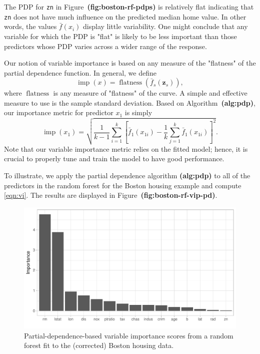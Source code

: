 \documentclass[12pt]{article}
\def\code#1{\texttt{#1}}
\def\ref#1{\textbf{(#1)}}
\DeclareMathOperator{\flatness}{flatness}
\DeclareMathOperator{\imp}{imp}
\begin{document}
The PDP for \code{zn} in Figure~\ref{fig:boston-rf-pdps} is relatively flat indicating that \code{zn} does not have much influence on the predicted median home value. In other words, the values $\bar{f}\left(x_{i}\right)$ display little variability. One might conclude that any variable for which the PDP is "flat" is likely to be less important than those predictors whose PDP varies across a wider range of the response.

Our notion of variable importance is based on any measure of the "flatness" of the partial dependence function. In general, we define
\begin{equation}
  \imp\left(x\right) = \flatness\left(\bar{f}_s\left(\boldsymbol{z}_s\right)\right),
\end{equation}
where $\flatness$ is any measure of "flatness" of the curve. A simple and effective measure to use is the sample standard deviation. Based on Algorithm~\ref{alg:pdp}, our importance metric for predictor $x_1$ is simply
\begin{equation}
\label{eqn:vi}
  \imp\left(x_1\right) = \sqrt{\frac{1}{k - 1}\sum_{i = 1}^k\left[\bar{f}_1\left(x_{1i}\right) - \frac{1}{k}\sum_{j = 1}^k\bar{f}_1\left(x_{1i}\right)\right] ^ 2}.
\end{equation}
Note that our variable importance metric relies on the fitted model; hence, it is crucial to properly tune and train the model to have good performance.

To illustrate, we apply the partial dependence algorithm \ref{alg:pdp} to all of the predictors in the random forest for the Boston housing example and compute \eqref{eqn:vi}. The results are displayed in Figure~\ref{fig:boston-rf-vip-pd}.

\begin{figure}[!htb]
  \label{boston-rf-vip-pd}
  \centering
  \includegraphics[width=1.0\textwidth]{boston-rf-vip-pd}
  \caption{Partial-dependence-based variable importance scores from a random forest fit to the (corrected) Boston housing data.}
\end{figure}
\end{document}

